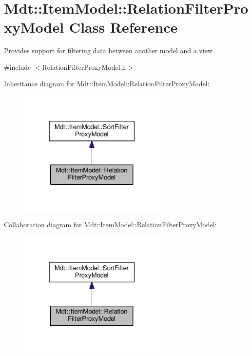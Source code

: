 \hypertarget{class_mdt_1_1_item_model_1_1_relation_filter_proxy_model}{}\section{Mdt\+:\+:Item\+Model\+:\+:Relation\+Filter\+Proxy\+Model Class Reference}
\label{class_mdt_1_1_item_model_1_1_relation_filter_proxy_model}


Provides support for filtering data between another model and a view.  




{\ttfamily \#include $<$Relation\+Filter\+Proxy\+Model.\+h$>$}



Inheritance diagram for Mdt\+:\+:Item\+Model\+:\+:Relation\+Filter\+Proxy\+Model\+:
\nopagebreak
\begin{figure}[H]
\begin{center}
\leavevmode
\includegraphics[width=211pt]{class_mdt_1_1_item_model_1_1_relation_filter_proxy_model__inherit__graph}
\end{center}
\end{figure}


Collaboration diagram for Mdt\+:\+:Item\+Model\+:\+:Relation\+Filter\+Proxy\+Model\+:
\nopagebreak
\begin{figure}[H]
\begin{center}
\leavevmode
\includegraphics[width=211pt]{class_mdt_1_1_item_model_1_1_relation_filter_proxy_model__coll__graph}
\end{center}
\end{figure}
